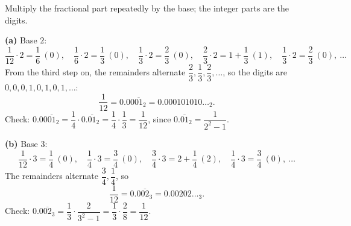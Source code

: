 Multiply the fractional part repeatedly by the base; the integer parts are the digits.

\textbf{(a)} Base $2$:
\[\dfrac{1}{12}\cdot2=\dfrac{1}{6}\ (0),\quad\dfrac{1}{6}\cdot2=\dfrac{1}{3}\ (0),\quad\dfrac{1}{3}\cdot2=\dfrac{2}{3}\ (0),\quad\dfrac{2}{3}\cdot2=1+\dfrac{1}{3}\ (1),\quad\dfrac{1}{3}\cdot2=\dfrac{2}{3}\ (0),\ \ldots\]
From the third step on, the remainders alternate $\dfrac{2}{3},\dfrac{1}{3},\dfrac{2}{3},\ldots$, so the digits are $0,0,0,1,0,1,0,1,\ldots$:
\[\dfrac{1}{12}=\boxed{0.00\overline{01}_2}=0.000101010\ldots{}_2.\]
Check: $0.00\overline{01}_2=\dfrac{1}{4}\cdot0.\overline{01}_2=\dfrac{1}{4}\cdot\dfrac{1}{3}=\dfrac{1}{12}$, since $0.\overline{01}_2=\dfrac{1}{2^2-1}$.

\textbf{(b)} Base $3$:
\[\dfrac{1}{12}\cdot3=\dfrac{1}{4}\ (0),\quad\dfrac{1}{4}\cdot3=\dfrac{3}{4}\ (0),\quad\dfrac{3}{4}\cdot3=2+\dfrac{1}{4}\ (2),\quad\dfrac{1}{4}\cdot3=\dfrac{3}{4}\ (0),\ \ldots\]
The remainders alternate $\dfrac{3}{4},\dfrac{1}{4}$, so
\[\dfrac{1}{12}=\boxed{0.0\overline{02}_3}=0.00202\ldots{}_3.\]
Check: $0.0\overline{02}_3=\dfrac{1}{3}\cdot\dfrac{2}{3^2-1}=\dfrac{1}{3}\cdot\dfrac{2}{8}=\dfrac{1}{12}$.
